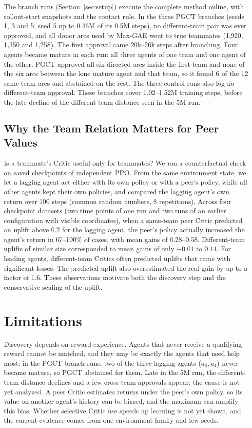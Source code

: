 \documentclass{article}
\begin{document}
The branch runs (Section~\ref{sec:setup}) execute the complete method online, with rollout-start snapshots and the contact rule. In the three PGCT branches (seeds 1, 3 and 5; seed 5 up to 0.46M of its 0.5M steps), no different-team pair was ever approved, and all donor arcs used by Max-GAE went to true teammates (1{,}920, 1{,}350 and 1{,}258). The first approval came 20k--26k steps after branching. Four agents became mature in each run: all three agents of one team and one agent of the other. PGCT approved all six directed arcs inside the first team and none of the six arcs between the lone mature agent and that team, so it found 6 of the 12 same-team arcs and abstained on the rest. The three control runs also log no different-team approval. These branches cover 1.02--1.52M training steps, before the late decline of the different-team distance seen in the 5M run.

\subsection{Why the Team Relation Matters for Peer Values}
Is a teammate's Critic useful only for teammates? We ran a counterfactual check on saved checkpoints of independent PPO. From the same environment state, we let a lagging agent act either with its own policy or with a peer's policy, while all other agents kept their own policies, and compared the lagging agent's own return over 100 steps (common random numbers, 8 repetitions). Across four checkpoint datasets (two time points of one run and two runs of an earlier configuration with visible coordinates), when a same-team peer Critic predicted an uplift above 0.2 for the lagging agent, the peer's policy actually increased the agent's return in 67--100\% of cases, with mean gains of 0.28--0.58. Different-team uplifts of similar size corresponded to mean gains of only $-0.01$ to $0.14$. For leading agents, different-team Critics often predicted uplifts that came with significant losses. The predicted uplift also overestimated the real gain by up to a factor of 1.6. These observations motivate both the discovery step and the conservative scaling of the uplift.

\section{Limitations}
Discovery depends on reward experience. Agents that never receive a qualifying reward cannot be matched, and they may be exactly the agents that need help most: in the PGCT branch runs, two of the three lagging agents ($a_0,a_4$) never became mature, so PGCT abstained for them. Late in the 5M run, the different-team distance declines and a few cross-team approvals appear; the cause is not yet analyzed. A peer Critic estimates returns under the peer's own policy, so its value on another agent's history can be biased, and the maximum can amplify this bias. Whether selective Critic use speeds up learning is not yet shown, and the current evidence comes from one environment family and few seeds.
\end{document}
